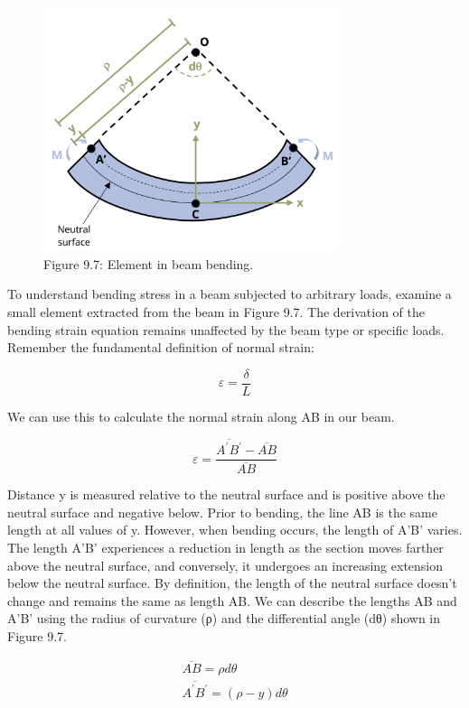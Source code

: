 \documentclass[
  letterpaper,
  DIV=11,
  numbers=noendperiod]{scrreprt}
\theoremstyle{definition}
\theoremstyle{remark}
\begin{document}
\begin{figure}[H]

{\centering \includegraphics[width=3.40625in,height=\textheight]{images/CH9 PNGs/Figure 9.7.png}

}

\caption{Figure 9.7: Element in beam bending.}

\end{figure}%

To understand bending stress in a beam subjected to arbitrary loads,
examine a small element extracted from the beam in Figure 9.7. The
derivation of the bending strain equation remains unaffected by the beam
type or specific loads. Remember the fundamental definition of normal
strain:

\[
\varepsilon=\frac{\delta}{L}
\]

We can use this to calculate the normal strain along AB in our beam.

\[
\varepsilon=\frac{\overline{A^{\prime} B^{\prime}}-\overline{A B}}{\overline{A B}}
\]

Distance y is measured relative to the neutral surface and is positive
above the neutral surface and negative below. Prior to bending, the line
AB is the same length at all values of y. However, when bending occurs,
the length of A'B' varies. The length A'B' experiences a reduction in
length as the section moves farther above the neutral surface, and
conversely, it undergoes an increasing extension below the neutral
surface. By definition, the length of the neutral surface doesn't change
and remains the same as length AB. We can describe the lengths AB and
A'B' using the radius of curvature (ρ) and the differential angle (dθ)
shown in Figure 9.7.

\[
\begin{gathered}
\overline{A B}=\rho d \theta \\
\overline{A^{\prime} B^{\prime}}=(\rho-y) d \theta
\end{gathered}
\]
\end{document}

